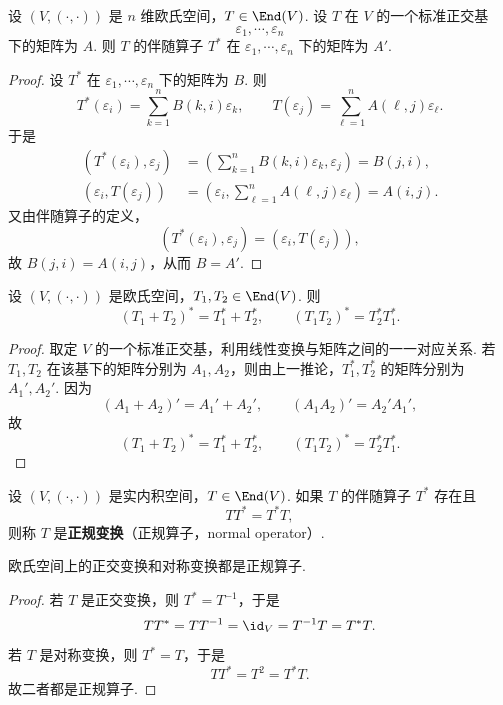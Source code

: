 \begin{corollary}
	设 $(V,(\cdot,\cdot))$ 是 $n$ 维欧氏空间，$T\in\End(V)$. 设 $T$ 在 $V$ 的一个标准正交基
	\[
	\varepsilon_1,\cdots,\varepsilon_n
	\]
	下的矩阵为 $A$. 则 $T$ 的伴随算子 $T^*$ 在 $\varepsilon_1,\cdots,\varepsilon_n$ 下的矩阵为 $A'$.
\end{corollary}
\begin{proof}
	设 $T^*$ 在 $\varepsilon_1,\cdots,\varepsilon_n$ 下的矩阵为 $B$. 则
	\[
	T^*(\varepsilon_i)=\sum_{k=1}^{n}B(k,i)\varepsilon_k,
	\qquad
	T(\varepsilon_j)=\sum_{\ell=1}^{n}A(\ell,j)\varepsilon_\ell.
	\]
	于是
	\[
	\begin{aligned}
		(T^*(\varepsilon_i),\varepsilon_j)
		&=\left(\sum_{k=1}^{n}B(k,i)\varepsilon_k,\varepsilon_j\right)=B(j,i),\\
		(\varepsilon_i,T(\varepsilon_j))
		&=\left(\varepsilon_i,\sum_{\ell=1}^{n}A(\ell,j)\varepsilon_\ell\right)=A(i,j).
	\end{aligned}
	\]
	又由伴随算子的定义，
	\[
	(T^*(\varepsilon_i),\varepsilon_j)=(\varepsilon_i,T(\varepsilon_j)),
	\]
	故 $B(j,i)=A(i,j)$，从而 $B=A'$.
\end{proof}

\begin{corollary}
	设 $(V,(\cdot,\cdot))$ 是欧氏空间，$T_1,T_2\in\End(V)$. 则
	\[
	(T_1+T_2)^*=T_1^*+T_2^*,
	\qquad
	(T_1T_2)^*=T_2^*T_1^*.
	\]
\end{corollary}
\begin{proof}
	取定 $V$ 的一个标准正交基，利用线性变换与矩阵之间的一一对应关系. 若 $T_1,T_2$ 在该基下的矩阵分别为 $A_1,A_2$，则由上一推论，$T_1^*,T_2^*$ 的矩阵分别为 $A_1',A_2'$. 因为
	\[
	(A_1+A_2)'=A_1'+A_2',
	\qquad
	(A_1A_2)'=A_2'A_1',
	\]
	故
	\[
	(T_1+T_2)^*=T_1^*+T_2^*,
	\qquad
	(T_1T_2)^*=T_2^*T_1^*.
	\]
\end{proof}

\begin{definition}
	设 $(V,(\cdot,\cdot))$ 是实内积空间，$T\in\End(V)$. 如果 $T$ 的伴随算子 $T^*$ 存在且
	\[
	TT^*=T^*T,
	\]
	则称 $T$ 是\textbf{正规变换}（正规算子，normal operator）.
\end{definition}

\begin{example}
	欧氏空间上的正交变换和对称变换都是正规算子.
\end{example}
\begin{proof}
	若 $T$ 是正交变换，则 $T^*=T^{-1}$，于是
	\[
	TT^*=TT^{-1}=\id_V=T^{-1}T=T^*T.
	\]
	若 $T$ 是对称变换，则 $T^*=T$，于是
	\[
	TT^*=T^2=T^*T.
	\]
	故二者都是正规算子.
\end{proof}


